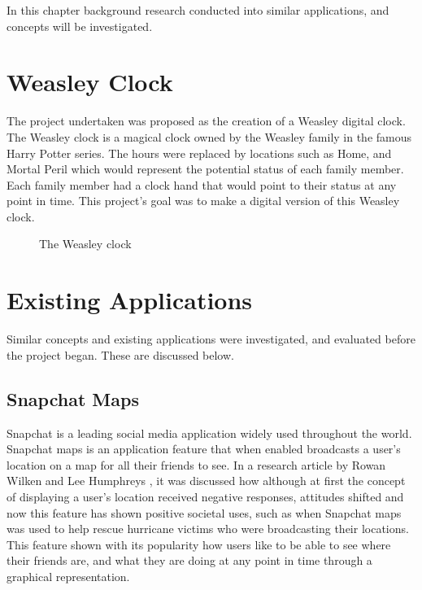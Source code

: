 In this chapter background research conducted into similar applications, and concepts will be investigated. 
\section{Weasley Clock}

The project undertaken was proposed as the creation of a Weasley digital clock. The Weasley clock is a magical clock owned by the Weasley family in the famous Harry Potter series. The hours were replaced by locations such as Home, and Mortal Peril which would represent the potential status of each family member. Each family member had a clock hand that would point to their status at any point in time. This project's goal was to make a digital version of this Weasley clock. 
\begin{figure}[!htbp]
    \centering
    \begin{subfigure}[b]{0.25\textwidth}
    \end{subfigure}
    \caption[The Weasley clock]{The Weasley clock \cite{weasClockWiki}}
    \label{fig:weasClock}
\end{figure}
\FloatBarrier

\section{Existing Applications}
Similar concepts and existing applications were investigated, and evaluated before the project began. These are discussed below. 


\subsection{Snapchat Maps}
Snapchat is a leading social media application widely used throughout the world. Snapchat maps is an application feature that when enabled broadcasts a user's location on a map for all their friends to see. In a research article by Rowan Wilken and Lee Humphreys \cite{snapMaps}, it was discussed how although at first the concept of displaying a user's location received negative responses, attitudes shifted and now this feature has shown positive societal uses, such as when Snapchat maps was used to help rescue hurricane victims who were broadcasting their locations. This feature shown with its popularity how users like to be able to see where their friends are, and what they are doing at any point in time through a graphical representation. 

